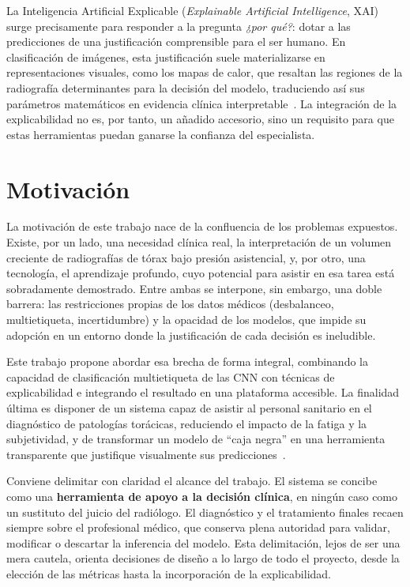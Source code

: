 La Inteligencia Artificial Explicable (\textit{Explainable Artificial
Intelligence}, XAI) surge precisamente para responder a la pregunta
\textit{¿por qué?}: dotar a las predicciones de una justificación comprensible
para el ser humano. En clasificación de imágenes, esta justificación suele
materializarse en representaciones visuales, como los mapas de calor, que
resaltan las regiones de la radiografía determinantes para la decisión del
modelo, traduciendo así sus parámetros matemáticos en evidencia clínica
interpretable~\cite{rajpurkarCheXNetRadiologistLevel2017, selvarajuGradCAMVisualExplanations2017}.
La integración de la explicabilidad no es, por tanto, un añadido accesorio, sino
un requisito para que estas herramientas puedan ganarse la confianza del
especialista.


\section{Motivación}

La motivación de este trabajo nace de la confluencia de los problemas expuestos.
Existe, por un lado, una necesidad clínica real, la interpretación de un volumen
creciente de radiografías de tórax bajo presión asistencial, y, por otro, una
tecnología, el aprendizaje profundo, cuyo potencial para asistir en esa tarea
está sobradamente demostrado. Entre ambas se interpone, sin embargo, una doble
barrera: las restricciones propias de los datos médicos (desbalanceo,
multietiqueta, incertidumbre) y la opacidad de los modelos, que impide su
adopción en un entorno donde la justificación de cada decisión es ineludible.

Este trabajo propone abordar esa brecha de forma integral, combinando la
capacidad de clasificación multietiqueta de las CNN con técnicas de
explicabilidad e integrando el resultado en una plataforma accesible. La
finalidad última es disponer de un sistema capaz de asistir al personal sanitario
en el diagnóstico de patologías torácicas, reduciendo el impacto de la fatiga y
la subjetividad, y de transformar un modelo de ``caja negra'' en una herramienta
transparente que justifique visualmente sus
predicciones~\cite{lizEnsemblesConvolutional2021, lizDeepLearningMultilabel2023}.

Conviene delimitar con claridad el alcance del trabajo. El sistema se concibe
como una \textbf{herramienta de apoyo a la decisión clínica}, en ningún caso como
un sustituto del juicio del radiólogo. El diagnóstico y el tratamiento finales
recaen siempre sobre el profesional médico, que conserva plena autoridad para
validar, modificar o descartar la inferencia del modelo. Esta delimitación, lejos
de ser una mera cautela, orienta decisiones de diseño a lo largo de todo el
proyecto, desde la elección de las métricas hasta la incorporación de la
explicabilidad.


